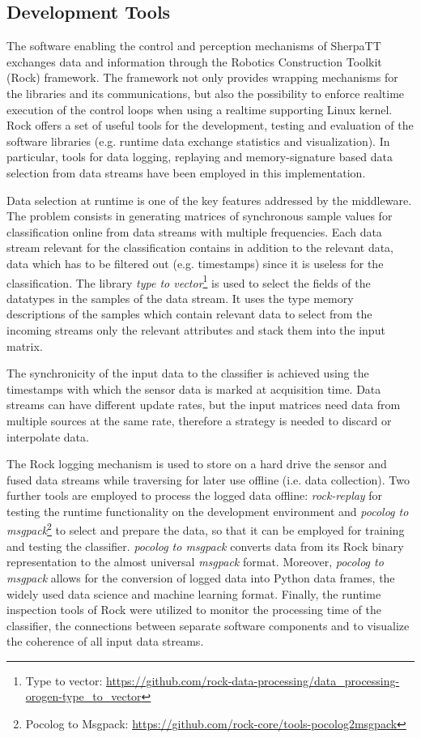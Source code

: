 \subsection{Development Tools}

The software enabling the control and perception mechanisms of SherpaTT exchanges data and information through the Robotics Construction Toolkit (Rock) framework. 
The framework not only provides wrapping mechanisms for the libraries and its communications, but also the possibility to enforce realtime execution of the control loops when using a realtime supporting Linux kernel. 
Rock offers a set of useful tools for the development, testing and evaluation of the software libraries (e.g. runtime data exchange statistics and visualization). 
In particular, tools for data logging, replaying and memory-signature based data selection from data streams have been employed in this implementation. 

Data selection at runtime is one of the key features addressed by the middleware. 
The problem consists in generating matrices of synchronous sample values for classification online from data streams with multiple frequencies.
Each data stream relevant for the classification contains in addition to the relevant data, data which has to be filtered out (e.g. timestamps) since it is useless for the classification.
The library \emph{type to vector}\footnote{Type to vector: \url{https://github.com/rock-data-processing/data_processing-orogen-type_to_vector}} is used to select the fields of the datatypes in the samples of the data stream. 
It uses the type memory descriptions of the samples which contain relevant data to select from the incoming streams only the relevant attributes and stack them into the input matrix. 

The synchronicity of the input data to the classifier is achieved using the timestamps with which the sensor data is marked at acquisition time.
Data streams can have different update rates, but the input matrices need data from multiple sources at the same rate, therefore a strategy is needed to discard or interpolate data. 

The Rock logging mechanism is used to store on a hard drive the sensor and fused data streams while traversing for later use offline (i.e. data collection). 
Two further tools are employed to process the logged data offline: \emph{rock-replay} for testing the runtime functionality on the development environment and \emph{pocolog to msgpack}\footnote{Pocolog to Msgpack: \url{https://github.com/rock-core/tools-pocolog2msgpack}} to select and prepare the data, so that it can be employed for training and testing the classifier.
\emph{pocolog to msgpack} converts data from its Rock binary representation to the almost universal \emph{msgpack} format.
Moreover, \emph{pocolog to msgpack} allows for the conversion of logged data into Python data frames, the widely used data science and machine learning format. 
Finally, the runtime inspection tools of Rock were utilized to monitor the processing time of the classifier, the connections between separate software components and to visualize the coherence of all input data streams. 

